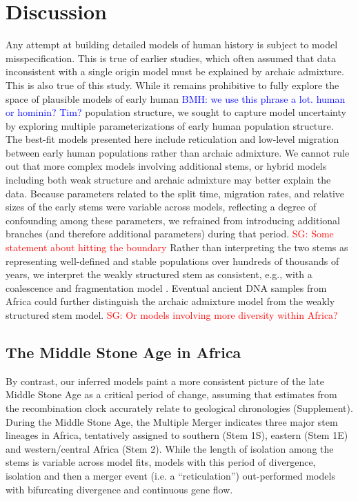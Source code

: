 \documentclass{article}
\newcommand{\sgcomment}[1]{{\textcolor{red}{SG: #1}}}
\newcommand{\bmhcomment}[1]{{\textcolor{blue}{BMH: #1}}}
\begin{document}
\section*{Discussion}

Any attempt at building detailed models of human history is subject to model
misspecification. This is true of earlier studies, which often assumed that
data inconsistent with a single origin model must be explained by archaic
admixture. This is also true of this study. While it remains prohibitive to
fully explore the space of plausible models of early human \bmhcomment{we use
this phrase a lot. human or hominin? Tim?} population structure, we sought to
capture model uncertainty by exploring multiple parameterizations of early
human population structure. The best-fit models presented here include
reticulation and low-level migration between early human populations rather
than archaic admixture. We cannot rule out that more complex models involving
additional stems, or hybrid models including both weak structure and archaic
admixture may better explain the data. Because parameters related to the split
time, migration rates, and relative sizes of the early stems were variable
across models, reflecting a degree of confounding among these parameters, we
refrained from introducing additional branches (and therefore additional
parameters) during that period. \sgcomment{Some statement about hitting the
boundary} Rather than interpreting the two stems as representing well-defined
and stable populations over hundreds of thousands of years, we interpret the
weakly structured stem as consistent, e.g., with a coalescence and
fragmentation model \citep{Scerri2019-xg}.  Eventual ancient DNA samples from
Africa could further distinguish the archaic admixture model from the weakly
structured stem model. \sgcomment{Or models involving more diversity within
Africa?}

\subsection*{The Middle Stone Age in Africa}

By contrast, our inferred models paint a more consistent picture of the late
Middle Stone Age as a critical period of change, assuming that estimates from
the recombination clock accurately relate to geological chronologies
(Supplement). During the Middle Stone Age, the Multiple Merger indicates three
major stem lineages in Africa, tentatively assigned to southern (Stem 1S),
eastern (Stem 1E) and western/central Africa (Stem 2). While the length of
isolation among the stems is variable across model fits, models with this
period of divergence, isolation and then a merger event (i.e. a “reticulation”)
out-performed models with bifurcating divergence and continuous gene flow. 
\end{document}
